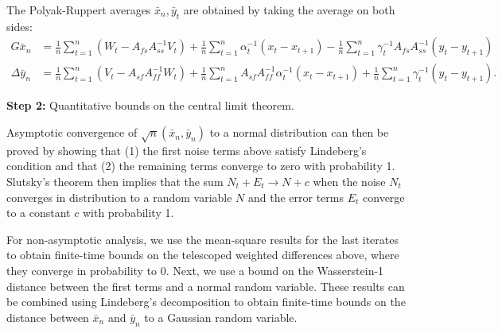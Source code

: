 The Polyak-Ruppert averages $\bar{x}_n, \bar{y}_t$ are obtained by taking the average on both sides:
\begin{align*}
    G \bar{x}_n &= \frac{1}{n} \sum_{t=1}^n (W_t - A_{fs} A_{ss}^{-1} V_t) + \frac{1}{n} \sum_{t=1}^n \alpha_t^{-1} (x_{t} - x_{t+1}) - \frac{1}{n} \sum_{t=1}^n \gamma_t^{-1} A_{fs} A_{ss}^{-1} (y_t - y_{t+1}) \\ 
    \Delta \bar{y}_n &= \frac{1}{n} \sum_{t=1}^n (V_t - A_{sf} A_{ff}^{-1} W_t) 
    + \frac{1}{n}\sum_{t=1}^n A_{sf} A_{ff}^{-1} \alpha_t^{-1} (x_{t} - x_{t+1})
    + \frac{1}{n}\sum_{t=1}^n \gamma_t^{-1} (y_{t} - y_{t+1})  .    
\end{align*}


\textbf{Step 2:} Quantitative bounds on the central limit theorem. 

Asymptotic convergence of $\sqrt{n} (\bar{x}_n, \bar{y}_n)$ to a normal distribution can then be proved by showing that (1) the first noise terms above satisfy Lindeberg's condition and that (2) the remaining terms converge to zero with probability 1.
Slutsky's theorem then implies that the sum $N_t + E_t \to N + c$ when the noise $N_t$ converges in distribution to a random variable $N$ and the error terms $E_t$ converge to a constant $c$ with probability 1. 



For non-asymptotic analysis, we use the mean-square results for the last iterates to obtain finite-time bounds on the telescoped weighted differences above, where they converge in probability to 0.
Next, we use a bound on the Wasserstein-1 distance between the first terms and a normal random variable. 
These results can be combined using Lindeberg's decomposition to obtain finite-time bounds on the distance between $\bar{x}_n$ and $\bar{y}_n$ to a Gaussian random variable. 


